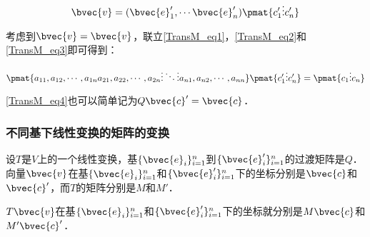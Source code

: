 \begin{equation}\label{TransM_eq3}
\bvec{v}=(\bvec{e}'_1, \cdots\bvec{e}'_n)\pmat{c'_1\newline\vdots\newline c_n'}
\end{equation}

考虑到$\bvec{v}=\bvec{v}$，联立\autoref{TransM_eq1}，\autoref{TransM_eq2}和\autoref{TransM_eq3}即可得到：

\begin{equation}\label{TransM_eq4}
\pmat{a_{11},a_{12},\cdots,a_{1n}\newline a_{21},a_{22},\cdots,a_{2n}\newline\vdots\ddots\vdots\newline a_{n1},a_{n2},\cdots,a_{nn}}\pmat{c'_1\newline\vdots\newline c_n'}=\pmat{c_1\newline\vdots\newline c_n}
\end{equation}

\autoref{TransM_eq4}也可以简单记为$Q\bvec{c}'=\bvec{c}$．

\subsubsection{不同基下线性变换的矩阵的变换}


设$T$是$V$上的一个线性变换，基$\{\bvec{e}_i\}_{i=1}^{n}$到$\{\bvec{e}'_i\}_{i=1}^{n}$的过渡矩阵是$Q$．向量$\bvec{v}$在基$\{\bvec{e}_i\}_{i=1}^{n}$和$\{\bvec{e}'_i\}_{i=1}^{n}$下的坐标分别是$\bvec{c}$和$\bvec{c}'$，而$T$的矩阵分别是$M$和$M'$．

$T\bvec{v}$在基$\{\bvec{e}_i\}_{i=1}^{n}$和$\{\bvec{e}'_i\}_{i=1}^{n}$下的坐标就分别是$M\bvec{c}$和$M'\bvec{c}'$．